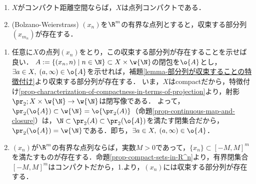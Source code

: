 \documentclass[uplatex,dvipdfmx]{jsreport}
\begin{document}
\begin{proposition}[コンパクト距離空間は点列コンパクトである]\mbox{}\label{prop-Bolzano-Weierstrass}
    \begin{enumerate}
        \item $X$がコンパクト距離空間ならば，$X$は点列コンパクトである．
        \item (Bolzano-Weierstrass) $(x_n)$を$\R^m$の有界な点列とすると，収束する部分列$(x_{m_n})$が存在する．
    \end{enumerate}
\end{proposition}
\begin{Proof}\mbox{}
    \begin{enumerate}
        \item 任意に$X$の点列$(x_n)$をとり，この収束する部分列が存在することを示せば良い．
        $A:=\{(x_n,n)\mid n\in\N\}\subset X\times\w{\N}$の閉包を$\o{A}$とし，$\exists a\in X,\;(a,\infty)\in\o{A}$を示せれば，補題\ref{lemma-部分列が収束することの特徴付け}より収束する部分列が存在する．
        いま，$X$はcompactだから，特徴付け\ref{prop-characterization-of-compactness-in-terms-of-projection}より，射影$\pr_2;X\times\w{\N}\to\w{\N}$は閉写像である．
        よって，$\pr_2(\o{A})\subset\w{\N}=\o{\pr_2(A)}$（命題\ref{prop-continuous-map-and-closure}）は，$\N\subset\pr_2(A)\subset\pr_2(\o{A})$を満たす閉集合だから，$\pr_2(\o{A})=\w{\N}$である．即ち，$\exists a\in X,\;(a,\infty)\in\o{A}$．
        \item 
        $(x_n)$が$\R^m$の有界な点列ならば，実数$M>0$であって，$\{x_n\}\subset[-M,M]^m$を満たすものが存在する．命題\ref{prop-compact-sets-in-R^n}より，有界閉集合$[-M,M]^m$はコンパクトだから，1.より，$(x_n)$には収束する部分列が存在する．
    \end{enumerate}
\end{Proof}
\end{document}

